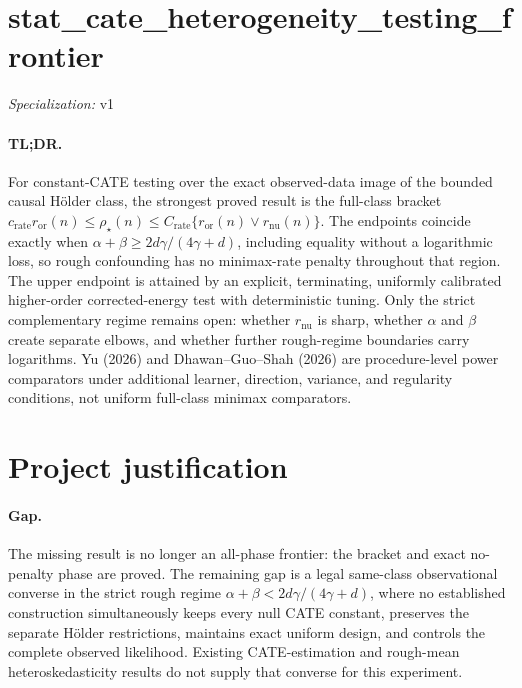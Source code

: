 \documentclass{article}
\begin{document}
\sloppy

\section*{stat\_\allowbreak{}cate\_\allowbreak{}heterogeneity\_\allowbreak{}testing\_\allowbreak{}frontier}

\noindent\textit{Specialization:} v1\par

\paragraph{TL;DR.} For constant-CATE testing over the exact observed-data image of the bounded causal Hölder class, the strongest proved result is the full-class bracket \(c_{\mathrm{rate}}r_{\mathrm{or}}(n)\le\rho_\star(n)\le C_{\mathrm{rate}}\{r_{\mathrm{or}}(n)\vee r_{\mathrm{nu}}(n)\}\). The endpoints coincide exactly when \(\alpha+\beta\ge2d\gamma/(4\gamma+d)\), including equality without a logarithmic loss, so rough confounding has no minimax-rate penalty throughout that region. The upper endpoint is attained by an explicit, terminating, uniformly calibrated higher-order corrected-energy test with deterministic tuning. Only the strict complementary regime remains open: whether \(r_{\mathrm{nu}}\) is sharp, whether \(\alpha\) and \(\beta\) create separate elbows, and whether further rough-regime boundaries carry logarithms. Yu (2026) and Dhawan--Guo--Shah (2026) are procedure-level power comparators under additional learner, direction, variance, and regularity conditions, not uniform full-class minimax comparators.

\section{Project justification}

\paragraph{Gap.} The missing result is no longer an all-phase frontier: the bracket and exact no-penalty phase are proved. The remaining gap is a legal same-class observational converse in the strict rough regime \(\alpha+\beta<2d\gamma/(4\gamma+d)\), where no established construction simultaneously keeps every null CATE constant, preserves the separate Hölder restrictions, maintains exact uniform design, and controls the complete observed likelihood. Existing CATE-estimation and rough-mean heteroskedasticity results do not supply that converse for this experiment.
\end{document}
